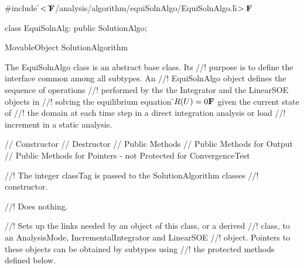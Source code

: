 
\indent \#include \f$<\tilde{
}{\bf F}$/analysis/algorithm/equiSolnAlgo/EquiSolnAlgo.h\f$>{\bf F}$ 

\indent class EquiSolnAlg: public SolutionAlgo;

\indent MovableObject
\indent\indent SolutionAlgorithm
\indent\indent{}

\indent The EquiSolnAlgo class is an abstract base class. Its
//! purpose is to define the interface common among all subtypes. An
//! EquiSolnAlgo object defines the sequence of operations 
//! performed by the the Integrator and the LinearSOE objects in
//! solving the equilibrium equation \f$R(U) = 0{\bf F}$ given the current state of
//! the domain at each time step in a direct integration analysis or load
//! increment in a static analysis.

\indent\indent // Constructor 
\indent{}
\indent\indent // Destructor
\indent{}
\indent\indent // Public Methods
\indent{}
\indent{}
\indent\indent // Public Methods for Output
\indent{}
\indent\indent // Public Methods for Pointers - not Protected for ConvergenceTest
\indent{}
 
\indent{} 
\indent{} 

//! The integer \p classTag is passed to the SolutionAlgorithm classes
//! constructor.

//! Does nothing.


//! Sets up the links needed by an object of this class, or a derived
//! class, to an AnalysisMode, IncrementalIntegrator and LinearSOE
//! object. Pointers to these objects can be obtained by subtypes using
//! the protected methods defined below. 

